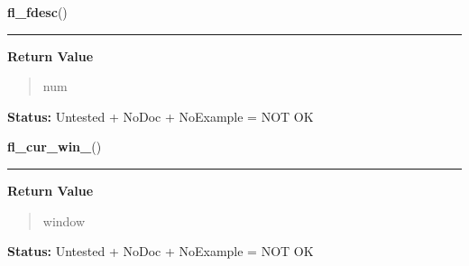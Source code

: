     \label{xformslib:library:fl_fdesc_}

    \vspace{0.5ex}

\hspace{.8\funcindent}\begin{boxedminipage}{\funcwidth}

    \raggedright \textbf{fl\_fdesc}()

    \vspace{-1.5ex}

    \rule{\textwidth}{0.5\fboxrule}
\setlength{\parskip}{2ex}
\setlength{\parskip}{1ex}
      \textbf{Return Value}
    \vspace{-1ex}

      \begin{quote}
      num

      \end{quote}

\textbf{Status:} Untested + NoDoc + NoExample = NOT OK



    \end{boxedminipage}

    \label{xformslib:library:fl_cur_win_}

    \vspace{0.5ex}

\hspace{.8\funcindent}\begin{boxedminipage}{\funcwidth}

    \raggedright \textbf{fl\_cur\_win\_}()

    \vspace{-1.5ex}

    \rule{\textwidth}{0.5\fboxrule}
\setlength{\parskip}{2ex}
\setlength{\parskip}{1ex}
      \textbf{Return Value}
    \vspace{-1ex}

      \begin{quote}
      window

      \end{quote}

\textbf{Status:} Untested + NoDoc + NoExample = NOT OK



    \end{boxedminipage}

